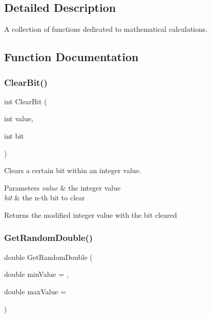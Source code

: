 \subsection{Detailed Description}
A collection of functions dedicated to mathematical calculations. 



\subsection{Function Documentation}
\mbox{\label{group__math__group_ga4ce9c5e2cee3bf609fcfba01c0f8e6a7}} 
\subsubsection{\texorpdfstring{Clear\+Bit()}{ClearBit()}}
{\footnotesize\ttfamily int Clear\+Bit (\begin{DoxyParamCaption}\item[{int}]{value,  }\item[{int}]{bit }\end{DoxyParamCaption})}

Clears a certain bit within an integer value.


\begin{DoxyParams}{Parameters}
{\em value} & the integer value \\
\hline
{\em bit} & the n-\/th bit to clear \\
\hline
\end{DoxyParams}
\begin{DoxyReturn}{Returns}
the modified integer value with the bit cleared 
\end{DoxyReturn}
\mbox{\label{group__math__group_ga298f9ccec14d3ea06c05ccd1e1e062ac}} 
\subsubsection{\texorpdfstring{Get\+Random\+Double()}{GetRandomDouble()}}
{\footnotesize\ttfamily double Get\+Random\+Double (\begin{DoxyParamCaption}\item[{double}]{min\+Value = {},  }\item[{double}]{max\+Value = {} }\end{DoxyParamCaption})}

